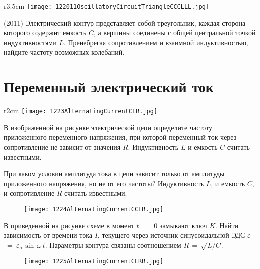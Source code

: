 \begin{wrapfigure}{r}{3.5cm}
\texttt{[image: 122011OscillatoryCircuitTriangleCCCLLL.jpg]}
\end{wrapfigure}

\AddProb (2011) Электрический контур представляет собой треугольник, каждая сторона которого содержит емкость $C$, 
а вершины соединены с общей центральной точкой индуктивностями $L$. 
Пренебрегая сопротивлением и взаимной индуктивностью, найдите частоту возможных колебаний.


\section{Переменный электрический ток}

\begin{wrapfigure}{r}{2cm}
\texttt{[image: 1223AlternatingCurrentCLR.jpg]}
\end{wrapfigure}

\AddProb В изображенной на рисунке электрической цепи определите частоту приложенного переменного напряжения, 
при которой переменный ток через сопротивление не зависит от значения $R$. Индуктивность $L$ и емкость $C$ считать известными.

\AddProb При каком условии амплитуда тока в цепи зависит только от амплитуды приложенного напряжения, 
но не от его частоты? Индуктивность $L$, и емкость $C$, и сопротивление $R$ считать известными.

\begin{figure}[!h]
\texttt{[image: 1224AlternatingCurrentCCLR.jpg]}
\end{figure}

\AddProb В приведенной на рисунке схеме в момент $t$~ =~0 замыкают ключ $K$. Найти зависимость от времени тока $I$, 
текущего через источник синусоидальной ЭДС {\Large $\varepsilon$}~=~{\Large $\varepsilon_o$}\,$\sin\,\omega\,t$.
Параметры контура связаны соотношением $R\,=\,\sqrt{L/C}$.

\begin{figure}[!h]
\texttt{[image: 1225AlternatingCurrentCLRR.jpg]}
\end{figure}